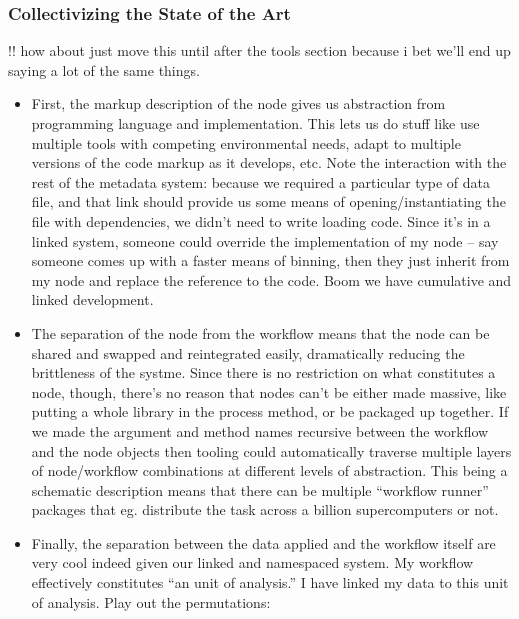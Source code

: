\documentclass[10pt]{article}
\begin{document}
\hypertarget{collectivizing-the-state-of-the-art}{%
\subsubsection{Collectivizing the State of the
Art}\label{collectivizing-the-state-of-the-art}}


\begin{multicols}{2}
 !! how about just move this until after the tools section
because i bet we'll end up saying a lot of the same things.

\begin{itemize}
\item
  First, the markup description of the node gives us abstraction from
  programming language and implementation. This lets us do stuff like
  use multiple tools with competing environmental needs, adapt to
  multiple versions of the code markup as it develops, etc. Note the
  interaction with the rest of the metadata system: because we required
  a particular type of data file, and that link should provide us some
  means of opening/instantiating the file with dependencies, we didn't
  need to write loading code. Since it's in a linked system, someone
  could override the implementation of my node -- say someone comes up
  with a faster means of binning, then they just inherit from my node
  and replace the reference to the code. Boom we have cumulative and
  linked development.
\item
  The separation of the node from the workflow means that the node can
  be shared and swapped and reintegrated easily, dramatically reducing
  the brittleness of the systme. Since there is no restriction on what
  constitutes a node, though, there's no reason that nodes can't be
  either made massive, like putting a whole library in the process
  method, or be packaged up together. If we made the argument and method
  names recursive between the workflow and the node objects then tooling
  could automatically traverse multiple layers of node/workflow
  combinations at different levels of abstraction. This being a
  schematic description means that there can be multiple ``workflow
  runner'' packages that eg. distribute the task across a billion
  supercomputers or not.
\item
  Finally, the separation between the data applied and the workflow
  itself are very cool indeed given our linked and namespaced system. My
  workflow effectively constitutes ``an unit of analysis.'' I have
  linked my data to this unit of analysis. Play out the permutations:


\end{itemize}
\end{multicols}
\end{document}
